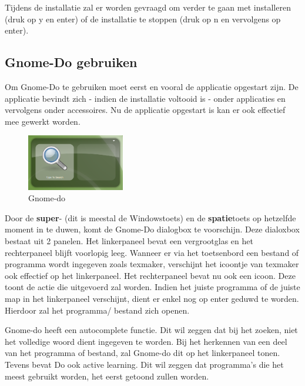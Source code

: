 \documentclass[12pt]{article} %
\begin{document}
Tijdens de installatie zal er worden gevraagd om verder te gaan met installeren (druk op y en enter) of de installatie te stoppen (druk op n en vervolgens op enter).



\newpage %



\subsection{Gnome-Do gebruiken} %
Om Gnome-Do te gebruiken moet eerst en vooral de applicatie opgestart zijn. De applicatie bevindt zich - indien de installatie voltooid is - onder applicaties en vervolgens onder accessoires. Nu de applicatie opgestart is kan er ook effectief mee gewerkt worden. 

\begin{figure} %
  \begin{center}
    \includegraphics[width=0.38\textwidth]{gnome}
  \end{center}
  \caption{Gnome-do}
\end{figure}

Door de {\bf super}- (dit is meestal de Windowstoets) en de {\bf spatie}toets op hetzelfde moment in te duwen, komt de Gnome-Do dialogbox te voorschijn. Deze dialoxbox bestaat uit 2 panelen. Het linkerpaneel bevat een vergrootglas en het rechterpaneel blijft voorlopig leeg. Wanneer er via het toetsenbord een bestand of programma wordt ingegeven zoals texmaker, verschijnt het icoontje van texmaker ook effectief op het linkerpaneel. Het rechterpaneel bevat nu ook een icoon. Deze toont de actie die uitgevoerd zal worden. Indien het juiste programma of de juiste map in het linkerpaneel verschijnt, dient er enkel nog op enter geduwd te worden. Hierdoor zal het programma/ bestand zich openen. 

\vspace{5 mm}

\setlength{\parindent}{0pt}Gnome-do heeft een autocomplete functie. Dit wil zeggen dat bij het zoeken, niet het volledige woord dient ingegeven te worden. Bij het herkennen van een deel van het programma of bestand, zal Gnome-do dit op het linkerpaneel tonen. Tevens bevat Do ook active learning. Dit wil zeggen dat programma's die het meest gebruikt worden, het eerst getoond zullen worden.
\end{document}
